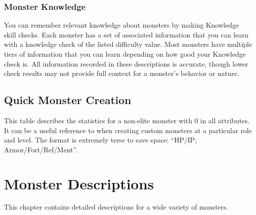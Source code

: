   \subsection{Monster Knowledge}
    You can remember relevant knowledge about monsters by making Knowledge skill checks.
    Each monster has a set of associated information that you can learn with a knowledge check of the listed difficulty value.
    Most monsters have multiple tiers of information that you can learn depending on how good your Knowledge check is.
    All information recorded in these descriptions is accurate, though lower check results may not provide full context for a monster's behavior or nature.

\section{Quick Monster Creation}

  This table describes the statistics for a non-elite monster with 0 in all attributes.
  It can be a useful reference to when creating custom monsters at a particular role and level.
  The format is extremely terse to save space: ``HP/IP; Armor/Fort/Ref/Ment''.

  

  \chapter{Monster Descriptions}

  This chapter contains detailed descriptions for a wide variety of monsters.

  
